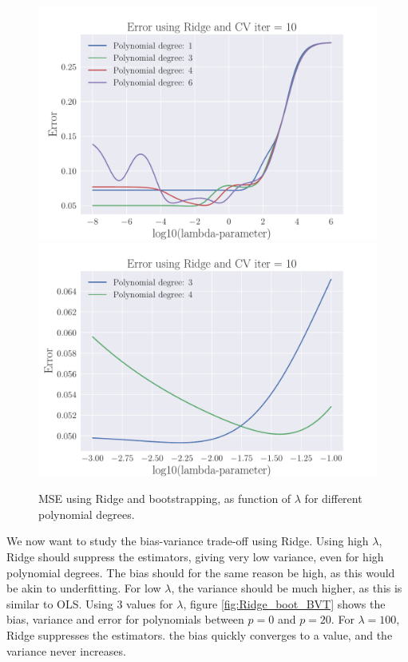 \documentclass[reprint,english,notitlepage,aps,nobalancelastpage,nofootinbib]{revtex4-1}  %
\begin{document}
\begin{figure}[h]
	\includegraphics[width=\linewidth]{lambdaMSE_Ridge_CV10_n30_eps02_p6_lm8_6.pdf}
	\endminipage\hfill
	\includegraphics[width=\linewidth]{lambdaMSE_Ridge_CV10_n30_eps02_p4_lm3_m1.pdf}
	\endminipage
	\caption{MSE using Ridge and bootstrapping, as function of $\lambda$ for different polynomial degrees.}
	\label{fig:Ridge_CV_lambdas}
\end{figure}

We now want to study the bias-variance trade-off using Ridge. Using high $\lambda$, Ridge should suppress the estimators, giving very low variance, even for high polynomial degrees. The bias should for the same reason be high, as this would be akin to underfitting. For low $\lambda$, the variance should be much higher, as this is similar to OLS.  Using 3 values for $\lambda$, figure \ref{fig:Ridge_boot_BVT} shows the bias, variance and error for polynomials between $p=0$ and $p=20$. For $\lambda=100$, Ridge suppresses the estimators.   the bias quickly converges to a value, and the variance never increases.
\end{document}
